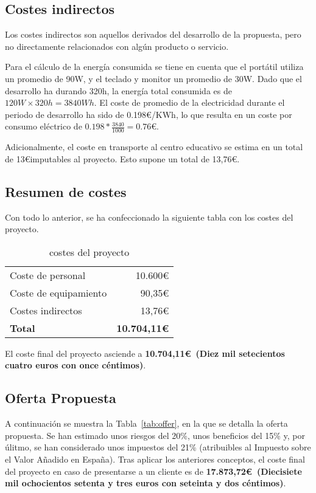 \subsection{Costes indirectos}\label{subsec:indirect-cost}
Los costes indirectos son aquellos derivados del desarrollo de la propuesta, pero no directamente relacionados con algún producto o servicio.

Para el cálculo de la energía consumida se tiene en cuenta que el portátil utiliza un promedio de 90W, y el teclado y monitor un promedio de 30W. Dado que el desarrollo ha durando 320h, la energía total consumida es de $120W\times 320h = 3840Wh$. El coste de promedio de la electricidad durante el periodo de desarrollo ha sido de 0.198\euro/KWh, lo que resulta en un coste por consumo eléctrico de $0.198*\frac{3840}{1000} = 0.76\euro$.

Adicionalmente, el coste en transporte al centro educativo se estima en un total de 13\euro imputables al proyecto. Esto supone un total de 13,76\euro.

\subsection{Resumen de costes}
Con todo lo anterior, se ha confeccionado la siguiente tabla con los costes del proyecto.

\begin{table}[H]
    \begin{tabular}{@{}lr@{}}
        \toprule
        Coste de personal & 10.600\euro\\
        Coste de equipamiento & 90,35\euro\\
        Costes indirectos & 13,76\euro\\ \midrule
        \textbf{Total} & \textbf{10.704,11\euro}\\
        \bottomrule
    \end{tabular}
    \caption{costes del proyecto}\label{tab:resumen-costes}
\end{table}

El coste final del proyecto asciende a \textbf{10.704,11\euro~(Diez mil setecientos cuatro euros con once céntimos)}.

\subsection{Oferta Propuesta}\label{subsec:offer}

A continuación se muestra la Tabla~\ref{tab:offer}, en la que se detalla la oferta propuesta. Se han estimado unos riesgos del 20\%, unos beneficios del 15\% y, por úlitmo, se han considerado unos impuestos del 21\% (atribuibles al Impuesto sobre el Valor Añadido en España). Tras aplicar los anteriores conceptos, el coste final del proyecto en caso de presentarse a un cliente es de \textbf{17.873,72\euro~(Diecisiete mil ochocientos setenta y tres euros con seteinta y dos céntimos)}.

